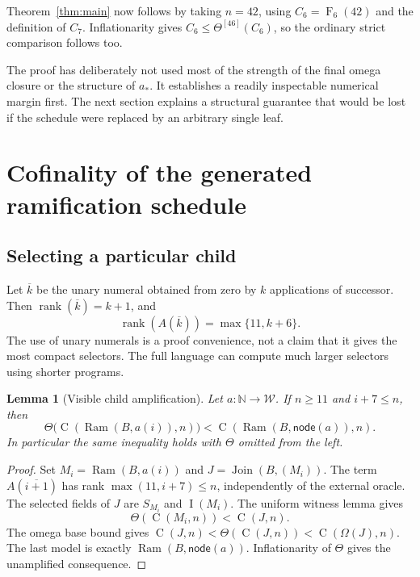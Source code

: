 \documentclass[11pt,letterpaper]{article}
\newtheorem{lemma}[theorem]{Lemma}
\theoremstyle{definition}
\newcommand{\N}{\mathbb N}
\newcommand{\W}{\mathcal W}
\newcommand{\rank}{\operatorname{rank}}
\newcommand{\MJoin}{\operatorname{Join}}
\newcommand{\Ram}{\operatorname{Ram}}
\newcommand{\Val}{\operatorname{C}}
\newcommand{\idx}{\operatorname{I}}
\newcommand{\FF}{\operatorname{F}}
\newcommand{\Iter}[2]{#1^{[#2]}}
\begin{document}
Theorem~\ref{thm:main} now follows by taking $n=42$, using
$C_6=\FF_6(42)$ and the definition of $C_7$. Inflationarity gives
$C_6\le\Iter\Theta{46}(C_6)$, so the ordinary strict comparison follows too.

The proof has deliberately not used most of the strength of the final omega
closure or the structure of $a_*$. It establishes a readily inspectable
numerical margin first. The next section explains a structural guarantee that
would be lost if the schedule were replaced by an arbitrary single leaf.

\section{Cofinality of the generated ramification schedule}
\label{sec:cofinality}

\subsection{Selecting a particular child}

Let $\overline k$ be the unary numeral obtained from zero by $k$ applications
of successor. Then $\rank(\overline k)=k+1$, and
\begin{equation}\label{eq:numeral-rank}
                  \rank(A(\overline k))=\max\{11,k+6\}.
\end{equation}
The use of unary numerals is a proof convenience, not a claim that it gives
the most compact selectors. The full language can compute much larger
selectors using shorter programs.

\begin{lemma}[Visible child amplification]\label{lem:child}
Let $a:\N\to\W$. If $n\ge11$ and $i+7\le n$, then
\[
 \Theta\bigl(\Val(\Ram(B,a(i)),n)\bigr)
       <\Val(\Ram(B,\mathsf{node}(a)),n).
\]
In particular the same inequality holds with $\Theta$ omitted from the left.
\end{lemma}
\begin{proof}
Set $M_i=\Ram(B,a(i))$ and $J=\MJoin(B,(M_i))$. The term
$A(\overline{i+1})$ has rank $\max(11,i+7)\le n$, independently of the
external oracle. The selected fields of $J$ are $S_{M_i}$ and $\idx(M_i)$.
The uniform witness lemma gives
\[
                   \Theta(\Val(M_i,n))<\Val(J,n).
\]
The omega base bound gives
$\Val(J,n)<\Theta(\Val(J,n))<\Val(\Omega(J),n)$.
The last model is exactly $\Ram(B,\mathsf{node}(a))$.
Inflationarity of $\Theta$ gives the unamplified consequence.
\end{proof}
\end{document}

